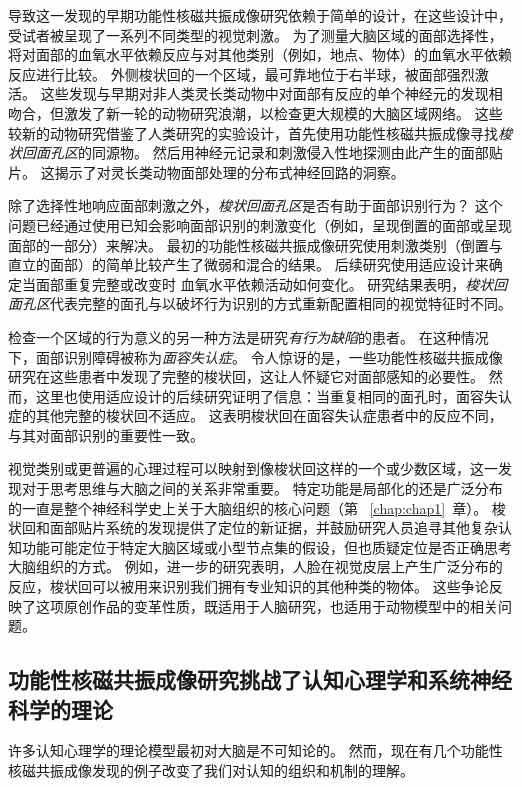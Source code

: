 导致这一发现的早期功能性核磁共振成像研究依赖于简单的设计，在这些设计中，受试者被呈现了一系列不同类型的视觉刺激。
为了测量大脑区域的面部选择性，将对面部的血氧水平依赖反应与对其他类别（例如，地点、物体）的血氧水平依赖反应进行比较。 
外侧梭状回的一个区域，最可靠地位于右半球，被面部强烈激活。
这些发现与早期对非人类灵长类动物中对面部有反应的单个神经元的发现相吻合，但激发了新一轮的动物研究浪潮，以检查更大规模的大脑区域网络。
这些较新的动物研究借鉴了人类研究的实验设计，首先使用功能性核磁共振成像寻找\textit{梭状回面孔区}的同源物。
然后用神经元记录和刺激侵入性地探测由此产生的面部贴片。
这揭示了对灵长类动物面部处理的分布式神经回路的洞察。


除了选择性地响应面部刺激之外，\textit{梭状回面孔区}是否有助于面部识别行为？ 
这个问题已经通过使用已知会影响面部识别的刺激变化（例如，呈现倒置的面部或呈现面部的一部分）来解决。 
最初的功能性核磁共振成像研究使用刺激类别（倒置与直立的面部）的简单比较产生了微弱和混合的结果。
后续研究使用适应设计来确定当面部重复完整或改变时 血氧水平依赖活动如何变化。
研究结果表明，\textit{梭状回面孔区}代表完整的面孔与以破坏行为识别的方式重新配置相同的视觉特征时不同。


检查一个区域的行为意义的另一种方法是研究\textit{有行为缺陷}的患者。
在这种情况下，面部识别障碍被称为\textit{面容失认症}。
令人惊讶的是，一些功能性核磁共振成像研究在这些患者中发现了完整的梭状回，这让人怀疑它对面部感知的必要性。 
然而，这里也使用适应设计的后续研究证明了信息：当重复相同的面孔时，面容失认症的其他完整的梭状回不适应。 
这表明梭状回在面容失认症患者中的反应不同，与其对面部识别的重要性一致。


视觉类别或更普遍的心理过程可以映射到像梭状回这样的一个或少数区域，这一发现对于思考思维与大脑之间的关系非常重要。
特定功能是局部化的还是广泛分布的一直是整个神经科学史上关于大脑组织的核心问题（第 ~\ref{chap:chap1}~章）。 
梭状回和面部贴片系统的发现提供了定位的新证据，并鼓励研究人员追寻其他复杂认知功能可能定位于特定大脑区域或小型节点集的假设，但也质疑定位是否正确思考大脑组织的方式。
例如，进一步的研究表明，人脸在视觉皮层上产生广泛分布的反应，梭状回可以被用来识别我们拥有专业知识的其他种类的物体。
这些争论反映了这项原创作品的变革性质，既适用于人脑研究，也适用于动物模型中的相关问题。



\subsection{功能性核磁共振成像研究挑战了认知心理学和系统神经科学的理论}

许多认知心理学的理论模型最初对大脑是不可知论的。 
然而，现在有几个功能性核磁共振成像发现的例子改变了我们对认知的组织和机制的理解。


